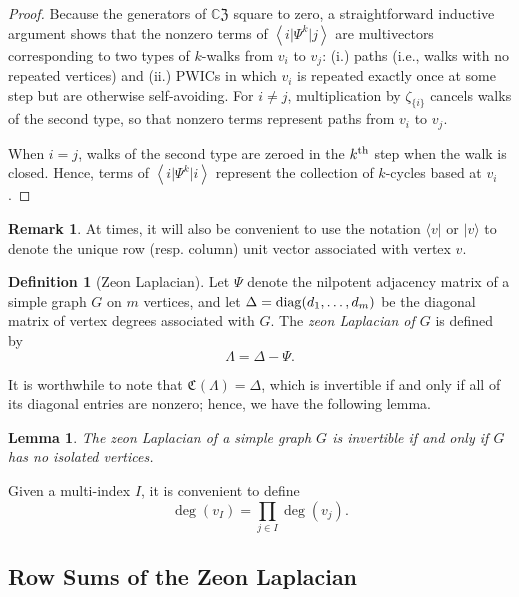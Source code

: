 \documentclass{article}
\newtheorem{lemma}[theorem]{Lemma}
\theoremstyle{definition}
\newtheorem{definition}[theorem]{Definition}
\newtheorem{remark}[theorem]{Remark}
\newcommand{\zco}{\mathfrak{C}\mspace{1mu}}
\newcommand{\CZ}{\mathbb{C}\mathfrak{Z}}
\numberwithin{equation}{section}
\begin{document}
\begin{proof}
Because the generators of $\CZ$ square to zero, a straightforward inductive argument shows that the nonzero terms of $\left<i\vert\Psi^k\vert j\right>$ are multivectors corresponding to two types of $k$-walks from $v_i$ to $v_j$: (i.) paths (i.e., walks with no repeated vertices) and (ii.) PWICs in which $v_i$ is repeated exactly once at some step but are otherwise self-avoiding.   For $i\ne j$, multiplication by $\zeta_{\{i\}}$ cancels walks of the second type, so that nonzero terms represent paths from $v_i$ to $v_j$.   

When $i=j$, walks of the second type are zeroed in the $k^{\rm th}$ step when the walk is closed. Hence, terms of $\left<i\vert \Psi^k\vert i\right>$ represent the collection of $k$-cycles based at $v_i$.
\end{proof}

\begin{remark}
At times, it will also be convenient to use the notation $\langle v \vert$ or $\vert v\rangle$ to denote the unique row (resp. column) unit vector associated with vertex $v$.   
\end{remark}


\begin{definition}[Zeon Laplacian]
Let $\Psi$ denote the nilpotent adjacency matrix of a simple graph $G$ on $m$ vertices, and let $\Delta={\rm diag}(d_1,\ldots, d_m)$ be the diagonal matrix of vertex degrees associated with $G$.  The {\em zeon Laplacian of $G$} is defined by \begin{equation}\label{zeon Laplacian def}
\Lambda=\Delta-\Psi.
\end{equation}
\end{definition}

It is worthwhile to note that $\zco(\Lambda)=\Delta$, which is invertible if and only if all of its diagonal entries are nonzero; hence, we have the following lemma.

\begin{lemma}
The zeon Laplacian of a simple graph $G$ is invertible if and only if $G$ has no isolated vertices.
\end{lemma}

Given a multi-index $I$, it is convenient to define \begin{equation*}
\deg(v_I)=\prod_{j\in I}\deg (v_j).
\end{equation*}

\subsection*{Row Sums of the Zeon Laplacian}
\end{document}
